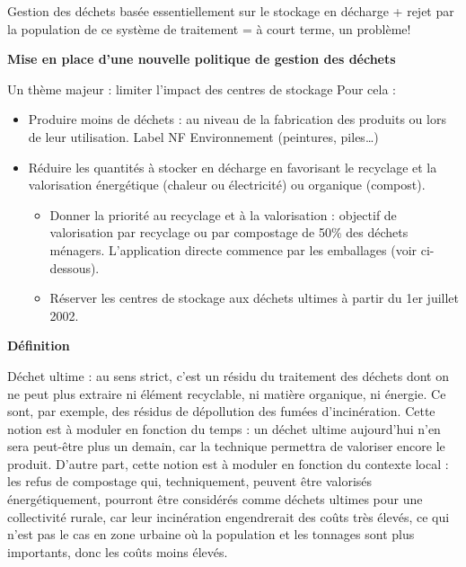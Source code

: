Gestion des déchets basée essentiellement sur le stockage en décharge + rejet par la population de ce système de traitement = à court terme, un problème!

\vspace{0.3cm}

\textbf{Mise en place d’une nouvelle politique de gestion des déchets}
\vspace{0.3cm}

Un thème majeur : limiter l'impact des centres de stockage
Pour cela :

\begin{itemize}
\item Produire moins de déchets : au niveau de la fabrication des produits ou lors de leur utilisation.
			Label NF Environnement (peintures, piles…)

\item Réduire les quantités à stocker en décharge en favorisant le recyclage et la valorisation énergétique (chaleur ou électricité) ou organique (compost).

    \begin{itemize}
    \item Donner la priorité au recyclage et à la valorisation : objectif de valorisation par recyclage ou par compostage de 50\% des déchets ménagers. L’application directe commence par les emballages (voir ci-dessous).
    \item  Réserver les centres de stockage aux déchets ultimes à partir du 1er juillet 2002.
    \end{itemize}
\end{itemize}

\vspace{0.3cm}
\textbf{Définition}
\vspace{0.3cm}

Déchet ultime : au sens strict, c’est un résidu du traitement des déchets dont on ne peut plus extraire ni élément recyclable, ni matière organique, ni énergie.
Ce sont, par exemple, des résidus de dépollution des fumées d’incinération. Cette notion est à moduler en fonction du temps : un déchet ultime aujourd’hui n’en sera peut-être plus un demain, car la technique permettra de valoriser encore le produit. D’autre part, cette notion est à moduler en fonction du contexte local : les refus de compostage qui, techniquement, peuvent être valorisés énergétiquement, pourront être considérés comme déchets ultimes pour une collectivité rurale, car leur incinération engendrerait des coûts très élevés, ce qui n’est pas le cas en zone urbaine où la population et les tonnages sont plus importants, donc les coûts moins élevés.

